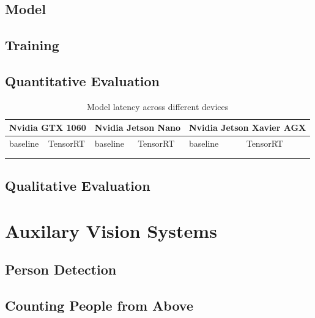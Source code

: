   \subsection{Model}\label{sec:model}

  \subsection{Training}\label{sec:training}
    
  \subsection{Quantitative Evaluation}\label{sec:eval}

  \begin{table}[]
    \begin{tabular}{|l|l|l|l|l|l|}
    \hline
    \multicolumn{2}{|l|}{Nvidia GTX 1060} & \multicolumn{2}{l|}{Nvidia Jetson Nano} & \multicolumn{2}{l|}{Nvidia Jetson Xavier AGX} \\ \hline
    baseline          & TensorRT          & baseline           & TensorRT           & baseline              & TensorRT              \\ \hline
                      &                   &                    &                    &                       &                       \\ \hline
                      &                   &                    &                    &                       &                       \\ \hline
    \end{tabular}
    \caption{Model latency across different devices}
    \end{table}

  \subsection{Qualitative Evaluation}\label{sec:gradcam}

\section{Auxilary Vision Systems}\label{sec:other}

  \subsection{Person Detection}

  \subsection{Counting People from Above}

